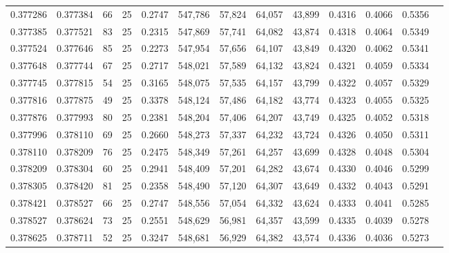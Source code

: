 \begin{tabular}{rrrrrrrrrrrrr}
0.377286 & 0.377384 &    66 &  25 &                                     0.2747 & 547,786 &  57,824 &  64,057 &  43,899 & 0.4316 & 0.4066 & 0.5356 \\
0.377385 & 0.377521 &    83 &  25 &                                     0.2315 & 547,869 &  57,741 &  64,082 &  43,874 & 0.4318 & 0.4064 & 0.5349 \\
0.377524 & 0.377646 &    85 &  25 &                                     0.2273 & 547,954 &  57,656 &  64,107 &  43,849 & 0.4320 & 0.4062 & 0.5341 \\
0.377648 & 0.377744 &    67 &  25 &                                     0.2717 & 548,021 &  57,589 &  64,132 &  43,824 & 0.4321 & 0.4059 & 0.5334 \\
0.377745 & 0.377815 &    54 &  25 &                                     0.3165 & 548,075 &  57,535 &  64,157 &  43,799 & 0.4322 & 0.4057 & 0.5329 \\
0.377816 & 0.377875 &    49 &  25 &                                     0.3378 & 548,124 &  57,486 &  64,182 &  43,774 & 0.4323 & 0.4055 & 0.5325 \\
0.377876 & 0.377993 &    80 &  25 &                                     0.2381 & 548,204 &  57,406 &  64,207 &  43,749 & 0.4325 & 0.4052 & 0.5318 \\
0.377996 & 0.378110 &    69 &  25 &                                     0.2660 & 548,273 &  57,337 &  64,232 &  43,724 & 0.4326 & 0.4050 & 0.5311 \\
0.378110 & 0.378209 &    76 &  25 &                                     0.2475 & 548,349 &  57,261 &  64,257 &  43,699 & 0.4328 & 0.4048 & 0.5304 \\
0.378209 & 0.378304 &    60 &  25 &                                     0.2941 & 548,409 &  57,201 &  64,282 &  43,674 & 0.4330 & 0.4046 & 0.5299 \\
0.378305 & 0.378420 &    81 &  25 &                                     0.2358 & 548,490 &  57,120 &  64,307 &  43,649 & 0.4332 & 0.4043 & 0.5291 \\
0.378421 & 0.378527 &    66 &  25 &                                     0.2747 & 548,556 &  57,054 &  64,332 &  43,624 & 0.4333 & 0.4041 & 0.5285 \\
0.378527 & 0.378624 &    73 &  25 &                                     0.2551 & 548,629 &  56,981 &  64,357 &  43,599 & 0.4335 & 0.4039 & 0.5278 \\
0.378625 & 0.378711 &    52 &  25 &                                     0.3247 & 548,681 &  56,929 &  64,382 &  43,574 & 0.4336 & 0.4036 & 0.5273 \\

\end{tabular}
